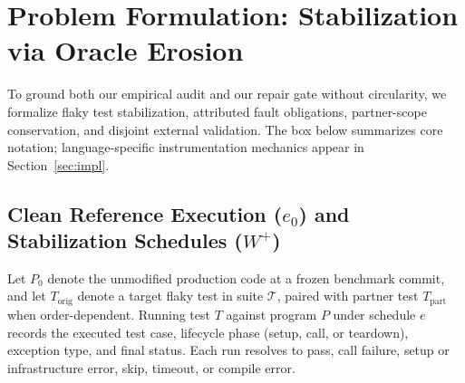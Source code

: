 \section{Problem Formulation: Stabilization via Oracle Erosion}
\label{sec:construct}

To ground both our empirical audit and our repair gate without circularity, we formalize flaky test stabilization, attributed fault obligations, partner-scope conservation, and disjoint external validation. The box below summarizes core notation; language-specific instrumentation mechanics appear in Section~\ref{sec:impl}.

\medskip
\noindent{}
\medskip

\subsection{Clean Reference Execution (\texorpdfstring{$e_0$}{e0}) and Stabilization Schedules (\texorpdfstring{$W^+$}{W+})}

Let $P_0$ denote the unmodified production code at a frozen benchmark commit, and let $T_{\text{orig}}$ denote a target flaky test in suite $\mathcal{T}$, paired with partner test $T_{\text{part}}$ when order-dependent. Running test $T$ against program $P$ under schedule $e$ records the executed test case, lifecycle phase (setup, call, or teardown), exception type, and final status. Each run resolves to pass, call failure, setup or infrastructure error, skip, timeout, or compile error.

